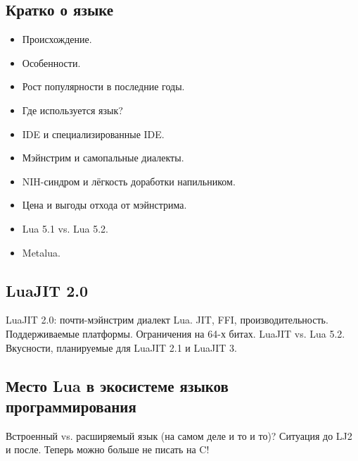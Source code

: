 \documentclass[aspectratio=169,handout]{beamer}
\begin{document}

\subsection*{Кратко о языке}

\begin{frame}
  \begin{itemize}
    \item Происхождение.
    \item Особенности.
    \item Рост популярности в последние годы.
    \item Где используется язык?
    \item IDE и специализированные IDE.
    \item Мэйнстрим и самопальные диалекты.
    \item NIH-синдром и лёгкость доработки напильником.
    \item Цена и выгоды отхода от мэйнстрима.
    \item Lua 5.1 vs. Lua 5.2.
    \item Metalua.
  \end{itemize}
\end{frame}


\subsection*{LuaJIT 2.0}

\begin{frame}
  LuaJIT 2.0: почти-мэйнстрим диалект Lua. JIT, FFI, производительность. Поддерживаемые платформы. Ограничения на 64-х битах. LuaJIT vs. Lua 5.2. Вкусности, планируемые для LuaJIT 2.1 и LuaJIT 3.
\end{frame}


\subsection*{Место Lua в экосистеме языков программирования}

\begin{frame}
  Встроенный vs. расширяемый язык (на самом деле и то и то)? Ситуация до LJ2 и после. Теперь можно больше не писать на C!
\end{frame}
\end{document}
